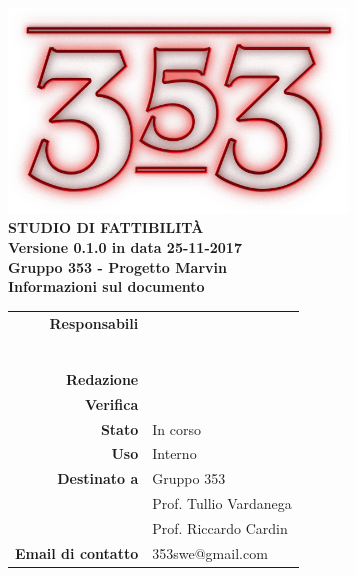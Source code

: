 \documentclass[openany, a4paper, 12pt]{report}
\begin{document}
\begin{titlepage}
	\centering
	\vfill
	{
		\bfseries
		\vskip2cm
		\includegraphics[width=9cm]{../../common/images/logo.png} \\
		\vfill
		\Huge{STUDIO DI FATTIBILITÀ}\\
		\vfill
		\Large Versione 0.1.0 in data 25-11-2017\\
		\large Gruppo 353 - Progetto Marvin\\
		\vfill
	\normalsize Informazioni sul documento\\
\begin{table}[htbp]
	\centering
	\renewcommand\arraystretch{1.2}
	\begin{tabular}{r|l}
		\hline
		\textbf{Responsabili}	& \Elena\\
								& \Valentina\\
								& \Mirco\\
								& \Riccardo\\
								& \Gianluca\\
								& \Parwinder\\
								& \Davide\\
		
		\textbf{Redazione} 	& \\
		\textbf{Verifica} 	& \\	
						
		\textbf{Stato} 			& In corso\\
		\textbf{Uso}			& Interno\\
		\textbf{Destinato a}   	& Gruppo 353\\
								& Prof. Tullio Vardanega\\
								& Prof. Riccardo Cardin\\
		
		\textbf{Email di contatto}	& 353swe@gmail.com
	\end{tabular}
\end{table}
		\vfill
	}    
\end{titlepage}

\tableofcontents
\newpage
{}









 
\end{document}
